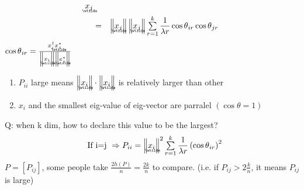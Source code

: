 \documentclass{article}
\begin{document}
\begin{itemize}
\begin{eqnarray*}
\underaccent{\wtilde}{x}%
_{j} \\
&=&\left\Vert 
\underaccent{\wtilde}{x}%
_{j}\right\Vert \left\Vert 
\underaccent{\wtilde}{x}%
_{j}\right\Vert \tsum\limits_{r=1}^{k}\frac{1}{\lambda r}\cos \theta
_{ir}\cos \theta _{jr}
\end{eqnarray*}%
$\cos \theta _{ir}=\frac{x_{i}^{\dagger }%
\underaccent{\wtilde}{x}%
_{j}^{\ast }}{\left\Vert 
\underaccent{\wtilde}{x}%
_{i}\right\Vert \left\Vert 
\underaccent{\wtilde}{e}%
_{j}^{\ast }\right\Vert }$

\begin{enumerate}
\item $P_{ii}$ large means $\left\Vert 
\underaccent{\wtilde}{x}%
_{i}\right\Vert \cdot \left\Vert 
\underaccent{\wtilde}{x}%
_{i}\right\Vert $ is relatively larger than other

\item $x_{i}$ and the smallest eig-value of eig-vector are parralel $\left(
\cos \theta =1\right) $
\end{enumerate}
\end{itemize}

\bigskip

Q: when k dim, how to declare this value to be the largest?%
\begin{equation*}
\text{If i=j }\Rightarrow P_{ii}=\left\Vert 
\underaccent{\wtilde}{x}%
_{i}\right\Vert ^{2}\tsum\limits_{r=1}^{k}\frac{1}{\lambda r}\left( \cos
\theta _{ir}\right) ^{2}
\end{equation*}%
$P=\left[ P_{ij}\right] $, some people take $\frac{2h\left( P\right) }{n}=%
\frac{2k}{n}$ to compare. (i.e. if $P_{ij}>2\frac{k}{n}$, it means $P_{ij}$
is large)
\end{document}
